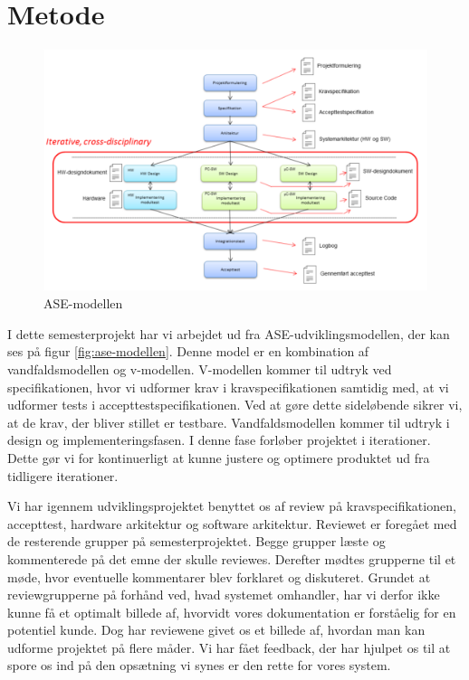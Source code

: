 \section{Metode}
	\begin{figure}[h!]
	\centering
	\includegraphics[width=0.8\linewidth]{Udviklingsproces/ASEmodellen}
	\caption{ASE-modellen \cite{ASE}}
	\label{fig:ase-modellen}
\end{figure}

I dette semesterprojekt har vi arbejdet ud fra ASE-udviklingsmodellen, der kan ses på figur \vref{fig:ase-modellen}. Denne model er en kombination af vandfaldsmodellen og v-modellen. V-modellen kommer til udtryk ved specifikationen, hvor vi udformer krav i kravspecifikationen samtidig med, at vi udformer tests i accepttestspecifikationen. Ved at gøre dette sideløbende sikrer vi, at de krav, der bliver stillet er testbare. Vandfaldsmodellen kommer til udtryk i design og implementeringsfasen. I denne fase forløber projektet i iterationer. Dette gør vi for kontinuerligt at kunne justere og optimere produktet ud fra tidligere iterationer. 
 
Vi har igennem udviklingsprojektet benyttet os af review på kravspecifikationen, accepttest, hardware arkitektur og software arkitektur. Reviewet er foregået med de resterende grupper på semesterprojektet. Begge grupper læste og kommenterede på det emne der skulle reviewes. Derefter mødtes grupperne til et møde, hvor eventuelle kommentarer blev forklaret og diskuteret. Grundet at reviewgrupperne på forhånd ved, hvad systemet omhandler, har vi derfor ikke kunne få et optimalt billede af, hvorvidt vores dokumentation er forståelig for en potentiel kunde. Dog har reviewene givet os et billede af, hvordan man kan udforme projektet på flere måder. Vi har fået feedback, der har hjulpet os til at spore os ind på den opsætning vi synes er den rette for vores system.   

